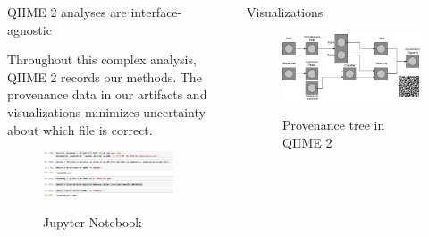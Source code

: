 \documentclass[final]{beamer}
\newlength{\sepwidth}
\newlength{\colwidth}
\newcommand{\separatorcolumn}{\begin{column}{\sepwidth}\end{column}}
\begin{document}
\begin{frame}[t]
\begin{columns}[t]
\begin{column}{\colwidth}
\begin{block}{QIIME 2 analyses are interface-agnostic}
    \begin{tcolorbox}
    [width=\textwidth, colframe=blue]
    {Throughout this complex analysis, QIIME 2 records our methods.
    The provenance data in our artifacts and visualizations minimizes
    uncertainty about which file is correct}.
    \end{tcolorbox}

    \begin{figure}[tph!]
      {\includegraphics[width=25cm]{assets/taxabar}}
      \caption{Jupyter Notebook}
      \label{fig:taxabar}
    \end{figure}

  \end{block}

\end{column}

\separatorcolumn

\begin{column}{\colwidth}

  \begin{block}{Visualizations}
    \begin{figure}[tph!]
      {\includegraphics[width=\linewidth]{assets/provenance}}
      \caption{Provenance tree in QIIME 2}
      \label{fig:provenance}
    \end{figure}


\end{block}
\end{column}
\end{columns}
\end{frame}
\end{document}

